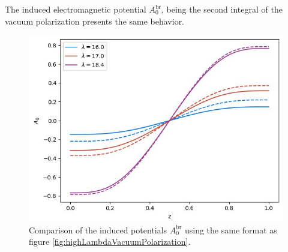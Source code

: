 The induced electromagnetic potential $A_0^\text{br}$, being the second integral of the vacuum polarization presents the same behavior. 
\begin{figure}
    \centering
    \includegraphics[width=0.5\linewidth]{figures/dirichlet/highLambdaValuesA0Induced.jpg}
    \caption{Comparison of the induced potentials $A_0^\text{br}$ using the same format as figure \ref{fig:highLambdaVacuumPolarization}.}
    \label{fig:enter-label}
\end{figure}

